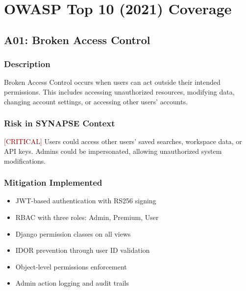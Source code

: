 \documentclass{report}
\begin{document}
\chapter{OWASP Top 10 (2021) Coverage}

\section{A01: Broken Access Control}

\subsection{Description}
Broken Access Control occurs when users can act outside their intended permissions. This includes accessing unauthorized resources, modifying data, changing account settings, or accessing other users' accounts.

\subsection{Risk in SYNAPSE Context}
\textcolor{darkred}{[CRITICAL]} Users could access other users' saved searches, workspace data, or API keys. Admins could be impersonated, allowing unauthorized system modifications.

\subsection{Mitigation Implemented}
\begin{itemize}
\item JWT-based authentication with RS256 signing
\item RBAC with three roles: Admin, Premium, User
\item Django permission classes on all views
\item IDOR prevention through user ID validation
\item Object-level permissions enforcement
\item Admin action logging and audit trails
\end{itemize}
\end{document}
